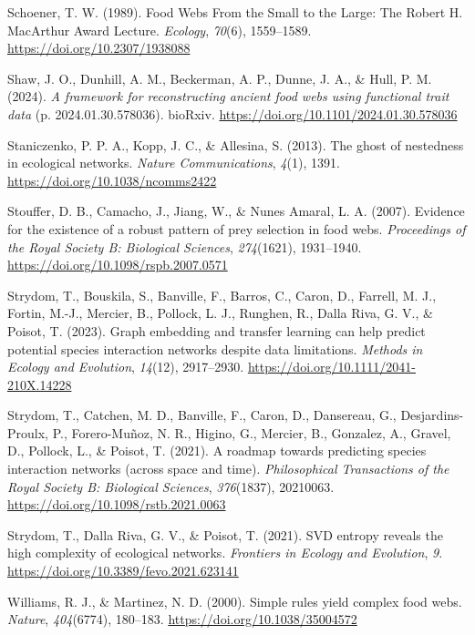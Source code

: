 \documentclass[
]{article}
\newlength{\cslhangindent}
\newenvironment{CSLReferences}[2] %
 {\begin{list}{}{%
  \setlength{\itemindent}{0pt}
  \setlength{\leftmargin}{0pt}
  \setlength{\parsep}{0pt}
  \ifodd #1
   \setlength{\leftmargin}{\cslhangindent}
   \setlength{\itemindent}{-1\cslhangindent}
  \fi
  \setlength{\itemsep}{#2\baselineskip}}}
 {\end{list}}
\begin{document}
\begin{CSLReferences}{1}{0}
Schoener, T. W. (1989). Food Webs From the Small to the Large: The
Robert H. MacArthur Award Lecture. \emph{Ecology}, \emph{70}(6),
1559--1589. \url{https://doi.org/10.2307/1938088}

Shaw, J. O., Dunhill, A. M., Beckerman, A. P., Dunne, J. A., \& Hull, P.
M. (2024). \emph{A framework for reconstructing ancient food webs using
functional trait data} (p. 2024.01.30.578036). bioRxiv.
\url{https://doi.org/10.1101/2024.01.30.578036}

Staniczenko, P. P. A., Kopp, J. C., \& Allesina, S. (2013). The ghost of
nestedness in ecological networks. \emph{Nature Communications},
\emph{4}(1), 1391. \url{https://doi.org/10.1038/ncomms2422}

Stouffer, D. B., Camacho, J., Jiang, W., \& Nunes Amaral, L. A. (2007).
Evidence for the existence of a robust pattern of prey selection in food
webs. \emph{Proceedings of the Royal Society B: Biological Sciences},
\emph{274}(1621), 1931--1940.
\url{https://doi.org/10.1098/rspb.2007.0571}

Strydom, T., Bouskila, S., Banville, F., Barros, C., Caron, D., Farrell,
M. J., Fortin, M.-J., Mercier, B., Pollock, L. J., Runghen, R., Dalla
Riva, G. V., \& Poisot, T. (2023). Graph embedding and transfer learning
can help predict potential species interaction networks despite data
limitations. \emph{Methods in Ecology and Evolution}, \emph{14}(12),
2917--2930. \url{https://doi.org/10.1111/2041-210X.14228}

Strydom, T., Catchen, M. D., Banville, F., Caron, D., Dansereau, G.,
Desjardins-Proulx, P., Forero-Muñoz, N. R., Higino, G., Mercier, B.,
Gonzalez, A., Gravel, D., Pollock, L., \& Poisot, T. (2021). A roadmap
towards predicting species interaction networks (across space and time).
\emph{Philosophical Transactions of the Royal Society B: Biological
Sciences}, \emph{376}(1837), 20210063.
\url{https://doi.org/10.1098/rstb.2021.0063}

Strydom, T., Dalla Riva, G. V., \& Poisot, T. (2021). SVD entropy
reveals the high complexity of ecological networks. \emph{Frontiers in
Ecology and Evolution}, \emph{9}.
\url{https://doi.org/10.3389/fevo.2021.623141}

Williams, R. J., \& Martinez, N. D. (2000). Simple rules yield complex
food webs. \emph{Nature}, \emph{404}(6774), 180--183.
\url{https://doi.org/10.1038/35004572}


\end{CSLReferences}
\end{document}
